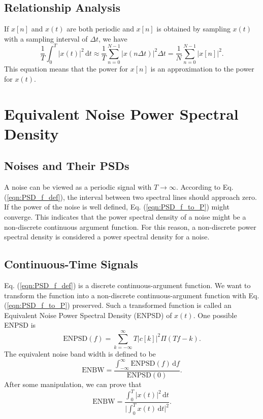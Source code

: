 \documentclass[journal,twoside]{IEEEtran}
\newcommand{\dd}{\,\mathrm{d}}
\begin{document}
\subsection{Relationship Analysis}

If $x[n]$ and $x(t)$ are both periodic and $x[n]$ is obtained by sampling $x(t)$ with a sampling interval of $\Delta t$, we have
\begin{equation}
\frac{1}{T}\int_{0}^{T}|x(t)|^2\dd t \approx \frac{1}{T}\sum_{n=0}^{N-1}|x(n \Delta t)|^2\Delta t = \frac{1}{N} \sum_{n=0}^{N-1}|x[n]|^2.
\end{equation}
This equation means that the power for $x[n]$ is an approximation to the power for $x(t)$. 




\section{Equivalent Noise Power Spectral Density}

\subsection{Noises and Their PSDs}

A noise can be viewed as a periodic signal with $T\rightarrow \infty$. According to Eq. (\ref{eqn:PSD_f_def}), the interval between two spectral lines should approach zero. If the power of the noise is well defined, Eq. (\ref{eqn:PSD_f_to_P}) might converge. This indicates that the power spectral density of a noise might be a non-discrete continuous argument function. For this reason, a non-discrete power spectral density is considered a power spectral density for a noise.

\subsection{Continuous-Time Signals}

Eq. (\ref{eqn:PSD_f_def}) is a discrete continuous-argument function. We want to transform the function into a non-discrete continuous-argument function with Eq. (\ref{eqn:PSD_f_to_P}) preserved. Such a transformed function is called an Equivalent Noise Power Spectral Density (ENPSD) of $x(t)$. One possible ENPSD is
\begin{equation}
\mathrm{ENPSD}(f) = \sum_{k=-\infty}^{\infty} T |c[k]|^2 \Pi (T f - k).
\end{equation}
The equivalent noise band width is defined to be
\begin{equation}
\mathrm{ENBW} = \frac{\int_{-\infty}^{\infty}\mathrm{ENPSD}(f)\dd f}{\mathrm{ENPSD}(0)}.
\end{equation}
After some manipulation, we can prove that
\begin{equation}
\mathrm{ENBW} = \frac{\int_{0}^{T}|x(t)|^2\dd t}{\lvert \int_{0}^{T}x(t)\dd t \rvert^2}.
\end{equation}
\end{document}
